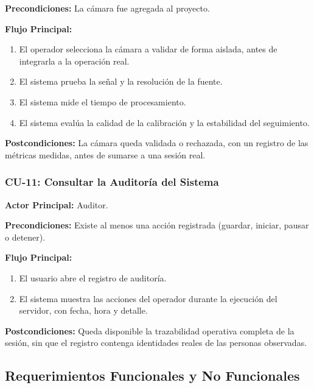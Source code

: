 \textbf{Precondiciones:} La cámara fue agregada al proyecto.

\textbf{Flujo Principal:}
\begin{enumerate}
  \item El operador selecciona la cámara a validar de forma aislada, antes de integrarla a la
  operación real.
  \item El sistema prueba la señal y la resolución de la fuente.
  \item El sistema mide el tiempo de procesamiento.
  \item El sistema evalúa la calidad de la calibración y la estabilidad del seguimiento.
\end{enumerate}

\textbf{Postcondiciones:} La cámara queda validada o rechazada, con un registro de las
métricas medidas, antes de sumarse a una sesión real.


\subsubsection{CU-11: Consultar la Auditoría del Sistema}
\textbf{Actor Principal:} Auditor.

\textbf{Precondiciones:} Existe al menos una acción registrada (guardar, iniciar, pausar o
detener).

\textbf{Flujo Principal:}
\begin{enumerate}
  \item El usuario abre el registro de auditoría.
  \item El sistema muestra las acciones del operador durante la ejecución del servidor, con
  fecha, hora y detalle.
\end{enumerate}

\textbf{Postcondiciones:} Queda disponible la trazabilidad operativa completa de la
sesión, sin que el registro contenga identidades reales de las personas observadas.


\subsection{Requerimientos Funcionales y No Funcionales}
\label{subsec:rf-rnf}

